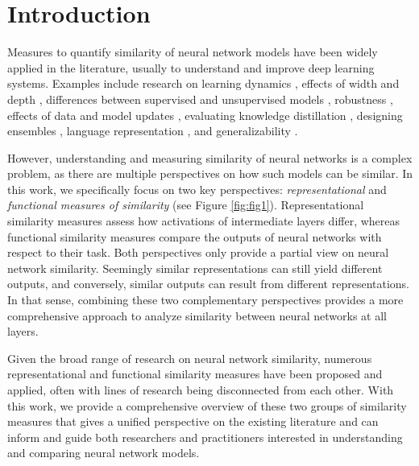 \documentclass{article}
\begin{document}
\section{Introduction}\label{sec:introduction}
Measures to quantify similarity of neural network models have been widely applied in the literature, usually to understand and improve deep learning systems. Examples include research on learning dynamics \cite{morcos_insights_2018, mehrer_beware_2018}, effects of width and depth \cite{nguyen_wide_2021}, differences between supervised and unsupervised models \cite{gwilliam_beyond_2022}, robustness \cite{jones_if_2022,nanda_measuring_2022}, effects of data and model updates \cite{milani_fard_launch_2016, liu_model_2022, klabunde_prediction_2023, mehrer_individual_2020}, evaluating knowledge distillation \cite{stanton_does_2022}, designing ensembles \cite{zhang_efficient_2021}, language representation \cite{kudugunta_investigating_2019, hamilton_cultural_2016, hamilton_diachronic_2018}, and generalizability \cite{mccoy_berts_2020, lee_diversify_2023, pagliardini_agree_2023}.

However, understanding and measuring similarity of neural networks is a complex problem, as there are multiple perspectives on how such models can be similar.
In this work, we specifically focus on two key perspectives: \emph{representational} and \emph{functional measures of similarity} (see Figure \ref{fig:fig1}).
Representational similarity measures assess how activations of intermediate layers differ, whereas functional similarity measures compare the outputs of neural networks with respect to their task.
Both perspectives only provide a partial view on neural network similarity.
Seemingly similar representations can still yield different outputs, and conversely, similar outputs can result from different representations.
In that sense, combining these two complementary perspectives provides a more comprehensive approach to analyze similarity between neural networks at all layers.

Given the broad range of research on neural network similarity, numerous representational and functional similarity measures have been proposed and applied, often with lines of research being disconnected from each other.
With this work, we provide a comprehensive overview of these two groups of similarity measures that gives a unified perspective on the existing literature and can inform and guide both researchers and practitioners interested in understanding and comparing neural network models.
\end{document}
